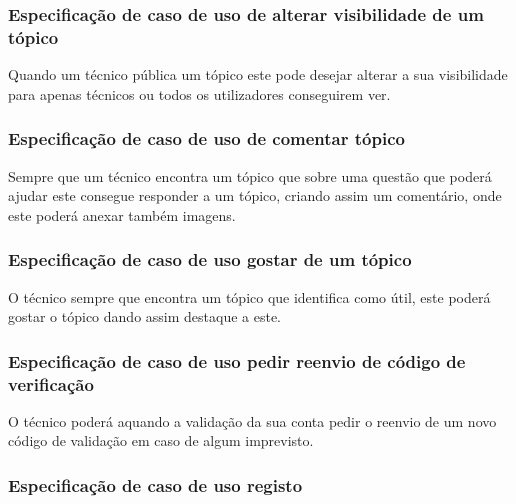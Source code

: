 

\subsubsection{Especificação de caso de uso de alterar visibilidade de um tópico}

Quando um técnico pública um tópico este pode desejar alterar a sua visibilidade para apenas técnicos ou 
todos os utilizadores conseguirem ver.



\newpage

\subsubsection{Especificação de caso de uso de comentar tópico}

Sempre que um técnico encontra um tópico que sobre uma questão que poderá ajudar este consegue responder 
a um tópico, criando assim um comentário, onde este poderá anexar também imagens.



\newpage

\subsubsection{Especificação de caso de uso gostar de um tópico}

O técnico sempre que encontra um tópico que identifica como útil, este poderá gostar o tópico dando assim 
destaque a este.



\subsubsection{Especificação de caso de uso pedir reenvio de código de verificação}

O técnico poderá aquando a validação da sua conta pedir o reenvio de um novo código de validação em caso 
de algum imprevisto.



\subsubsection{Especificação de caso de uso registo}

